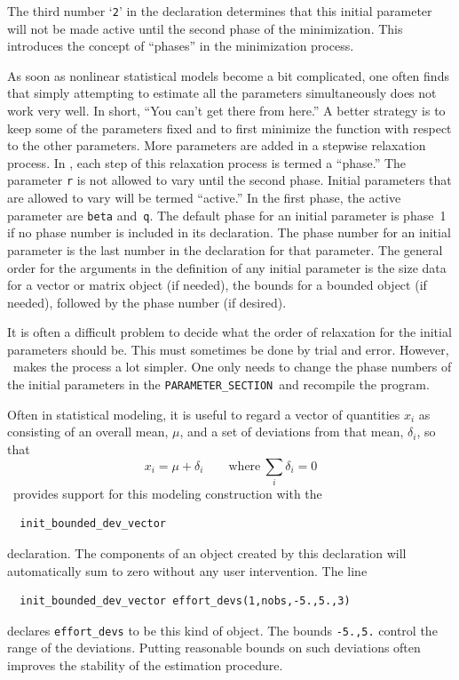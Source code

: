 \documentclass{admbmanual}
\newcommand\PS{\texttt{PARAMETER\_SECTION}}
\begin{document}
The third number `\texttt{2}' in the declaration determines that
this initial parameter will not be made active until the second
phase of the minimization. This introduces the
concept of ``phases'' in the minimization process. 

As soon as nonlinear statistical models become a bit
complicated, one often finds that simply attempting to
estimate all the parameters simultaneously does not
work very well. In short, ``You can't get there from here.''
A better strategy is to keep some of the
parameters fixed and to first minimize the function 
with respect to the other parameters. More 
parameters are added in a stepwise relaxation process.
In \ADM, each step of this relaxation process is termed a ``phase.''
The parameter \texttt{r} is not allowed to vary until
the second phase. Initial parameters that are allowed to
vary will be termed ``active.''  In the first phase,
the active parameter are \texttt{beta} and~\texttt{q}. 
The default phase for an initial parameter
is phase~1 if no phase number is included in its declaration. 
The phase
number for an initial parameter is the last number in the
declaration for that parameter. The general order for the arguments
in the definition of
any initial parameter is the size data for
a vector or matrix object (if needed), the bounds 
for a bounded object (if needed), followed by
the phase number (if desired). 

It is often a difficult problem to decide what the order of
relaxation for the initial parameters should be. This must
sometimes be done by trial and error. However, \ADM\
 makes the process a lot simpler. One only needs to
change the phase numbers of the initial parameters
in the \PS\ and recompile the program.

Often in statistical modeling, it is useful to regard a vector
of quantities {$x_i$} as consisting of an overall mean, $\mu$,
and a set of deviations from that mean, $\delta_i$, so that
$$x_i=\mu+\delta_i \qquad\textrm{where}\ \sum_i \delta_i=0 $$ 
\ADM\ provides support for this modeling construction with
the
\begin{lstlisting}
  init_bounded_dev_vector
\end{lstlisting}
declaration. The components of
an object created by this declaration will automatically sum to zero
without any user intervention. 
The line 
\begin{lstlisting}
  init_bounded_dev_vector effort_devs(1,nobs,-5.,5.,3)
\end{lstlisting}
declares \texttt{effort\_devs} to be this kind of object.
The bounds \texttt{-5.,5.}
control the range of the deviations. Putting reasonable bounds
on such deviations often improves the stability of the
estimation procedure.
\end{document}
